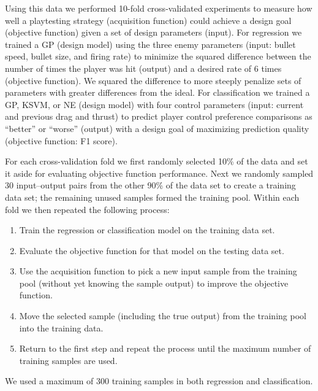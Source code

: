 \documentclass{sig-alternate}
\begin{document}
Using this data we performed 10-fold cross-validated experiments to measure how well a playtesting strategy (acquisition function) could achieve a design goal (objective function) given a set of design parameters (input).
For regression we trained a GP (design model) using the three enemy parameters (input: bullet speed, bullet size, and firing rate) to minimize the squared difference between the number of times the player was hit (output) and a desired rate of 6 times (objective function).
We squared the difference to more steeply penalize sets of parameters with greater differences from the ideal.
For classification we trained a GP, KSVM, or NE (design model) with four control parameters (input: current and previous drag and thrust) to predict player control preference comparisons as ``better'' or ``worse'' (output) with a design goal of maximizing prediction quality (objective function: F1 score).


For each cross-validation fold we first randomly selected 10\% of the data and set it aside for evaluating objective function performance.
Next we randomly sampled 30 input--output pairs from the other 90\% of the data set to create a training data set; the remaining unused samples formed the training pool.
Within each fold we then repeated the following process:
\begin{enumerate}
\item Train the regression or classification model on the training data set.
\item Evaluate the objective function for that model on the testing data set.
\item Use the acquisition function to pick a new input sample from the training pool (without yet knowing the sample output) to improve the objective function.
\item Move the selected sample (including the true output) from the training pool into the training data.
\item Return to the first step and repeat the process until the maximum number of training samples are used.
\end{enumerate}
\noindent We used a maximum of 300 training samples in both regression and classification.
\end{document}
